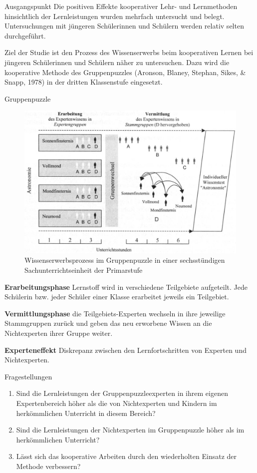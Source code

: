 \begin{block}{Ausgangspunkt}
Die positiven Effekte kooperativer Lehr- und Lernmethoden hinsichtlich der Lernleistungen wurden mehrfach untersucht und belegt. Untersuchungen mit jüngeren Schülerinnen und Schülern werden relativ selten durchgeführt.

Ziel der Studie ist den Prozess des Wissenserwerbs beim kooperativen Lernen bei jüngeren Schülerinnen und Schülern näher zu untersuchen. Dazu wird die kooperative Methode des Gruppenpuzzles (Aronson, Blaney, Stephan, Sikes, \& Snapp, 1978) in der dritten Klassenstufe eingesetzt.
\end{block}

\begin{block}{Gruppenpuzzle} 
\begin{figure}
\includegraphics[width=0.67\linewidth]{experteneffekt.jpg}
\caption{Wissenserwerbsprozess im Gruppenpuzzle in einer sechsstündigen Sachunterrichtseinheit der Primarstufe}
\end{figure}

\textbf{Erarbeitungsphase} Lernstoff wird in verschiedene Teilgebiete aufgeteilt. Jede Schülerin bzw. jeder Schüler einer Klasse erarbeitet jeweils ein Teilgebiet.

\textbf{Vermittlungsphase} die Teilgebiets-Experten wechseln in ihre jeweilige Stammgruppen zurück und geben das neu erworbene Wissen an die Nichtexperten ihrer Gruppe weiter. 

\textbf{Experteneffekt} Diskrepanz zwischen den Lernfortschritten von Experten und Nichtexperten.  
\end{block}

\begin{alertblock}{Fragestellungen}
\begin{enumerate}
\item Sind die Lernleistungen der Gruppenpuzzleexperten in ihrem eigenen Expertenbereich höher als die von Nichtexperten und Kindern im herkömmlichen Unterricht in diesem Bereich?

\item Sind die Lernleistungen der Nichtexperten im Gruppenpuzzle höher als im herkömmlichen Unterricht?

\item Lässt sich das kooperative Arbeiten durch den wiederholten Einsatz der Methode verbessern?
\end{enumerate}
\end{alertblock}
